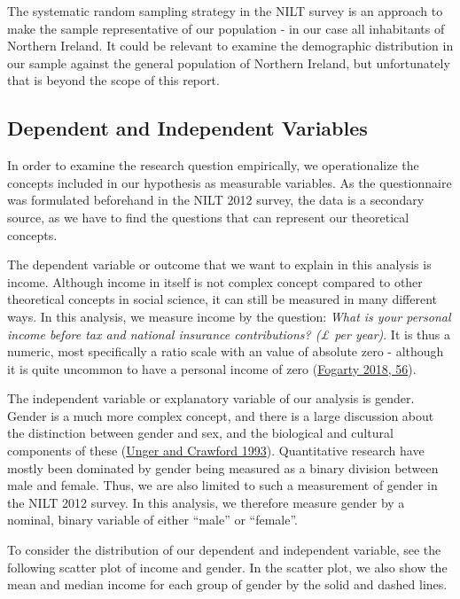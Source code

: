 \documentclass[
]{article}
\begin{document}
The systematic random sampling strategy in the NILT survey is an
approach to make the sample representative of our population - in our
case all inhabitants of Northern Ireland. It could be relevant to
examine the demographic distribution in our sample against the general
population of Northern Ireland, but unfortunately that is beyond the
scope of this report.

\hypertarget{dependent-and-independent-variables}{%
\subsection{Dependent and Independent
Variables}\label{dependent-and-independent-variables}}

In order to examine the research question empirically, we operationalize
the concepts included in our hypothesis as measurable variables. As the
questionnaire was formulated beforehand in the NILT 2012 survey, the
data is a secondary source, as we have to find the questions that can
represent our theoretical concepts.

The dependent variable or outcome that we want to explain in this
analysis is income. Although income in itself is not complex concept
compared to other theoretical concepts in social science, it can still
be measured in many different ways. In this analysis, we measure income
by the question: \emph{What is your personal income before tax and
national insurance contributions? (£ per year)}. It is thus a numeric,
most specifically a ratio scale with an value of absolute zero -
although it is quite uncommon to have a personal income of zero
(\protect\hyperlink{ref-fogarty2018quantitative}{Fogarty 2018, 56}).

The independent variable or explanatory variable of our analysis is
gender. Gender is a much more complex concept, and there is a large
discussion about the distinction between gender and sex, and the
biological and cultural components of these
(\protect\hyperlink{ref-unger1993sex}{Unger and Crawford 1993}).
Quantitative research have mostly been dominated by gender being
measured as a binary division between male and female. Thus, we are also
limited to such a measurement of gender in the NILT 2012 survey. In this
analysis, we therefore measure gender by a nominal, binary variable of
either ``male'' or ``female''.

To consider the distribution of our dependent and independent variable,
see the following scatter plot of income and gender. In the scatter
plot, we also show the mean and median income for each group of gender
by the solid and dashed lines.
\end{document}
